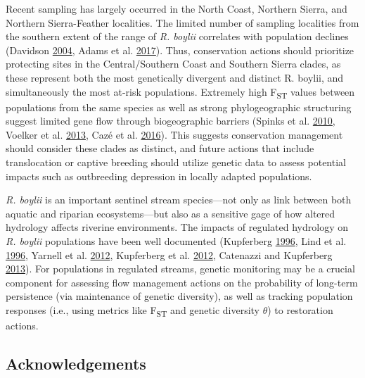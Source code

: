 \documentclass[proquest,12pt,final]{ucthesis-CA2012} %
\begin{document}
\begin{ucmainmatter}
Recent sampling has largely occurred in the North Coast, Northern
Sierra, and Northern Sierra-Feather localities. The limited number of
sampling localities from the southern extent of the range of \emph{R.
boylii} correlates with population declines (Davidson
\protect\hyperlink{ref-davidson_declining_2004}{2004}, Adams et al.
\protect\hyperlink{ref-adams_rapid_2017}{2017}). Thus, conservation
actions should prioritize protecting sites in the Central/Southern Coast
and Southern Sierra clades, as these represent both the most genetically
divergent and distinct R. boylii, and simultaneously the most at-risk
populations. Extremely high F\textsubscript{ST} values between
populations from the same species as well as strong phylogeographic
structuring suggest limited gene flow through biogeographic barriers
(Spinks et al. \protect\hyperlink{ref-spinks_nuclear_2010}{2010},
Voelker et al. \protect\hyperlink{ref-voelker_river_2013}{2013}, Cazé et
al. \protect\hyperlink{ref-caze_could_2016}{2016}). This suggests
conservation management should consider these clades as distinct, and
future actions that include translocation or captive breeding should
utilize genetic data to assess potential impacts such as outbreeding
depression in locally adapted populations.

\emph{R. boylii} is an important sentinel stream species---not only as
link between both aquatic and riparian ecosystems---but also as a
sensitive gage of how altered hydrology affects riverine environments.
The impacts of regulated hydrology on \emph{R. boylii} populations have
been well documented (Kupferberg
\protect\hyperlink{ref-kupferberg_hydrologic_1996}{1996}, Lind et al.
\protect\hyperlink{ref-lind_effects_1996}{1996}, Yarnell et al.
\protect\hyperlink{ref-yarnell_dynamic_2012}{2012}, Kupferberg et al.
\protect\hyperlink{ref-kupferberg_effects_2012}{2012}, Catenazzi and
Kupferberg \protect\hyperlink{ref-catenazzi_importance_2013}{2013}). For
populations in regulated streams, genetic monitoring may be a crucial
component for assessing flow management actions on the probability of
long-term persistence (via maintenance of genetic diversity), as well as
tracking population responses (i.e., using metrics like
F\textsubscript{ST} and genetic diversity \(\theta\)) to restoration
actions.

\hypertarget{acknowledgements-1}{%
\subsection{Acknowledgements}\label{acknowledgements-1}}


\end{ucmainmatter}
\end{document}
